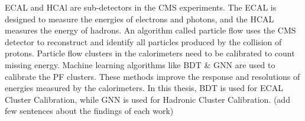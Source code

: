

ECAL and HCAl are sub-detectors in the CMS experiments.
The ECAL is designed to measure the energies of electrons and photons, and the HCAL measures the energy of hadrons.
An algorithm called particle flow uses the CMS detector to reconstruct and identify all particles produced by the collision of protons.
Particle flow clusters in the calorimeters need to be calibrated to count missing energy.
Machine learning algorithms like BDT & GNN are used to calibrate the PF clusters.
These methods improve the response and resolutions of energies measured by the calorimeters.
In this thesis, BDT is used for ECAL Cluster Calibration, while GNN is used for Hadronic Cluster Calibration. 
(add few sentences about the findings of each work) 















    

    
    

